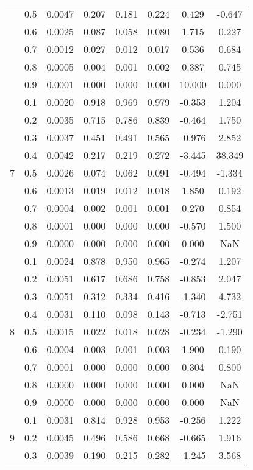 \documentclass[11pt,a4paper]{report}
\begin{document}
\begin{longtable}{ | c | c || c | c | c | c | c | c | }
 & 0.5 & 0.0047 & 0.207 & 0.181 & 0.224 & 0.429 & -0.647 \\
 & 0.6 & 0.0025 & 0.087 & 0.058 & 0.080 & 1.715 & 0.227 \\
 & 0.7 & 0.0012 & 0.027 & 0.012 & 0.017 & 0.536 & 0.684 \\
 & 0.8 & 0.0005 & 0.004 & 0.001 & 0.002 & 0.387 & 0.745 \\
 & 0.9 & 0.0001 & 0.000 & 0.000 & 0.000 & 10.000 & 0.000 \\
 \hline
\multirow{9}{*}{7} & 0.1 & 0.0020 & 0.918 & 0.969 & 0.979 & -0.353 & 1.204 \\
 & 0.2 & 0.0035 & 0.715 & 0.786 & 0.839 & -0.464 & 1.750 \\
 & 0.3 & 0.0037 & 0.451 & 0.491 & 0.565 & -0.976 & 2.852 \\
 & 0.4 & 0.0042 & 0.217 & 0.219 & 0.272 & -3.445 & 38.349 \\
 & 0.5 & 0.0026 & 0.074 & 0.062 & 0.091 & -0.494 & -1.334 \\
 & 0.6 & 0.0013 & 0.019 & 0.012 & 0.018 & 1.850 & 0.192 \\
 & 0.7 & 0.0004 & 0.002 & 0.001 & 0.001 & 0.270 & 0.854 \\
 & 0.8 & 0.0001 & 0.000 & 0.000 & 0.000 & -0.570 & 1.500 \\
 & 0.9 & 0.0000 & 0.000 & 0.000 & 0.000 & 0.000 & NaN \\
 \hline
\multirow{9}{*}{8} & 0.1 & 0.0024 & 0.878 & 0.950 & 0.965 & -0.274 & 1.207 \\
 & 0.2 & 0.0051 & 0.617 & 0.686 & 0.758 & -0.853 & 2.047 \\
 & 0.3 & 0.0051 & 0.312 & 0.334 & 0.416 & -1.340 & 4.732 \\
 & 0.4 & 0.0031 & 0.110 & 0.098 & 0.143 & -0.713 & -2.751 \\
 & 0.5 & 0.0015 & 0.022 & 0.018 & 0.028 & -0.234 & -1.290 \\
 & 0.6 & 0.0004 & 0.003 & 0.001 & 0.003 & 1.900 & 0.190 \\
 & 0.7 & 0.0001 & 0.000 & 0.000 & 0.000 & 0.304 & 0.800 \\
 & 0.8 & 0.0000 & 0.000 & 0.000 & 0.000 & 0.000 & NaN \\
 & 0.9 & 0.0000 & 0.000 & 0.000 & 0.000 & 0.000 & NaN \\
 \hline
\multirow{9}{*}{9} & 0.1 & 0.0031 & 0.814 & 0.928 & 0.953 & -0.256 & 1.222 \\
 & 0.2 & 0.0045 & 0.496 & 0.586 & 0.668 & -0.665 & 1.916 \\
 & 0.3 & 0.0039 & 0.190 & 0.215 & 0.282 & -1.245 & 3.568 \\

\end{longtable}
\end{document}
